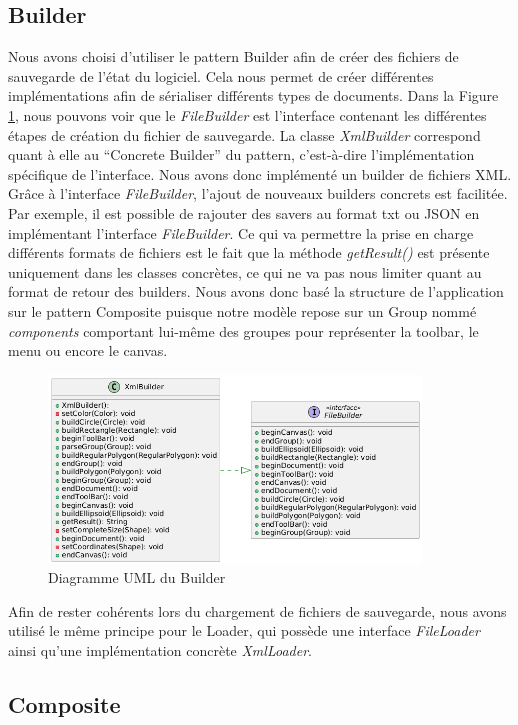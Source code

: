 \documentclass{article}
\begin{document}
\subsection{Builder}
Nous avons choisi d'utiliser le pattern Builder afin de créer des fichiers de sauvegarde de l'état du logiciel. Cela nous permet de créer différentes implémentations
afin de sérialiser différents types de documents. Dans la Figure \ref{Builder}, nous pouvons voir que le \textit{FileBuilder} est l'interface contenant les différentes étapes de création
du fichier de sauvegarde. La classe \textit{XmlBuilder} correspond quant à elle au ``Concrete Builder'' du pattern, c'est-à-dire l'implémentation spécifique
de l'interface. Nous avons donc implémenté un builder de fichiers XML. Grâce à l'interface \textit{FileBuilder}, l'ajout de nouveaux builders concrets est facilitée.
Par exemple, il est possible de rajouter des savers au format txt ou JSON en implémentant l'interface \textit{FileBuilder}.
Ce qui va permettre la prise en charge différents formats de fichiers est le fait que la méthode \textit{getResult()} est présente uniquement dans les classes concrètes, ce qui ne va pas nous
limiter quant au format de retour des builders. Nous avons donc basé la structure de l'application sur le pattern Composite puisque notre modèle repose sur un Group nommé \textit{components}
comportant lui-même des groupes pour représenter la toolbar, le menu ou encore le canvas.

\begin{figure}[h]
    \centering
    \includegraphics[width=\textwidth,height=5.0cm,keepaspectratio]{builder.png}
    \caption{Diagramme UML du Builder}
    \label{Builder}
\end{figure}
\FloatBarrier

Afin de rester cohérents lors du chargement de fichiers de sauvegarde, nous avons utilisé le même principe pour le Loader,
qui possède une interface \textit{FileLoader} ainsi qu'une implémentation concrète \textit{XmlLoader}.

\subsection{Composite}
\end{document}
